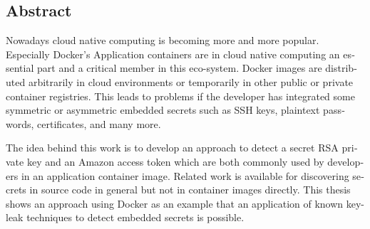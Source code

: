 
\begin{otherlanguage}{american}
\chapter*{Abstract}
Nowadays cloud native computing is becoming more and more popular. Especially Docker’s Application containers are in cloud native computing an essential part and a critical member in this eco-system. 
Docker images are distributed arbitrarily in cloud environments or temporarily in other public or private container registries. This leads to problems if the developer has integrated some symmetric or asymmetric embedded secrets such as SSH keys, plaintext passwords, certificates, and many more.

The idea behind this work is to develop an approach to detect a secret RSA private key and an Amazon access token which are both commonly used by developers in an application container image. Related work is available for discovering secrets in source code in general but not in container images directly. This thesis shows an approach using Docker as an example that an application of known key-leak techniques to detect embedded secrets is possible.
\end{otherlanguage}